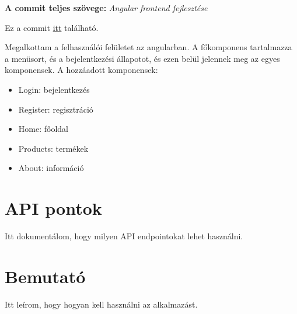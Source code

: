 \documentclass[]{article}
\begin{document}
\noindent
\textbf{A commit teljes szövege:} \textit{Angular frontend fejlesztése}

\bigskip
\noindent
Ez a commit \href{https://github.com/Gtomika/prf-project/commit/53e7acb28718a72afb40870192a166d8839e0d08}{itt} található.
\bigskip

Megalkottam a felhasználói felületet az angularban. A főkomponens tartalmazza a menüsort, és a bejelentkezési állapotot, és ezen belül jelennek meg az egyes komponensek. A hozzáadott komponensek:

\begin{itemize}
	\item Login: bejelentkezés
	\item Register: regisztráció
	\item Home: főoldal
	\item Products: termékek
	\item About: információ
\end{itemize}

\section{API pontok}

Itt dokumentálom, hogy milyen API endpointokat lehet használni.

\section{Bemutató}

Itt leírom, hogy hogyan kell használni az alkalmazást.
\end{document}
